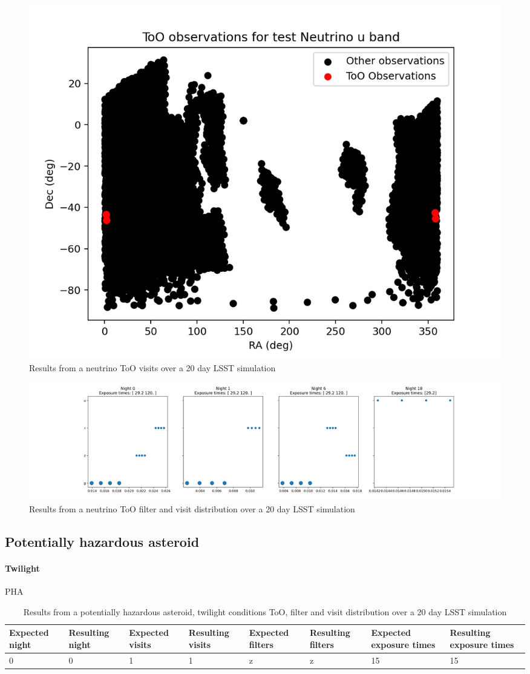 \begin{figure}[h!]
    \centering
    \includegraphics[width=0.85\linewidth]{figures/validationTests/SVRequired/NeutrinoPosition.png}
    \caption{Results from a neutrino ToO visits over a 20 day LSST simulation}
    \label{fig:NeutrinoPositionResult}
\end{figure}

\begin{figure}[h!]
    \centering
    \includegraphics[width=\linewidth]{figures/validationTests/SVRequired/NeutrinoFilterPlot.png}
    \caption{Results from a neutrino ToO filter and visit distribution over a 20 day LSST simulation}
    \label{fig:NeutrinoFilterResult}
\end{figure}
\clearpage


\subsection{Potentially hazardous asteroid}
\paragraph{Twilight} PHA
\begin{table}[h!]
\centering
\begin{adjustbox}{max width=\textwidth}
\begin{tabular}{|l|l|l|l|l|l|l|l|}
\hline
Expected night & Resulting night & Expected visits & Resulting visits & Expected filters & Resulting filters & Expected exposure times & Resulting exposure times \\ \hline
0              & 0               & 1               & 1                & z                & z                 & 15                      & 15                       \\ \hline
\end{tabular}
\end{adjustbox}
\caption{Results from a potentially hazardous asteroid, twilight conditions ToO, filter and visit distribution over a 20 day LSST simulation}
\label{tab:PHATwiResult}
\end{table}

